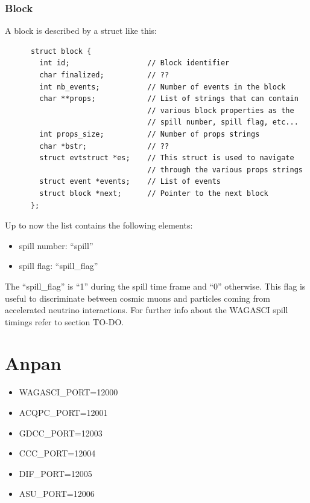 \subsubsection{Block}
A block is described by a struct like this:
\begin{lstlisting}
      struct block {
        int id;                  // Block identifier
        char finalized;          // ??
        int nb_events;           // Number of events in the block
        char **props;            // List of strings that can contain
                                 // various block properties as the
                                 // spill number, spill flag, etc...
        int props_size;          // Number of props strings
        char *bstr;              // ??
        struct evtstruct *es;    // This struct is used to navigate
                                 // through the various props strings
        struct event *events;    // List of events
        struct block *next;      // Pointer to the next block
      };
\end{lstlisting}
Up to now the  list contains the following elements:
\begin{itemize}
\item spill number: ``spill''
\item spill flag: ``spill\_flag''
\end{itemize}

The ``spill\_flag'' is ``1'' during the spill time frame and ``0''
otherwise. This flag is useful to discriminate between cosmic muons
and particles coming from accelerated neutrino interactions.  For
further info about the WAGASCI spill timings refer to section TO-DO.\@

\section{Anpan}
\begin{itemize}
\item WAGASCI\_PORT=12000
\item ACQPC\_PORT=12001
\item GDCC\_PORT=12003
\item CCC\_PORT=12004
\item DIF\_PORT=12005
\item ASU\_PORT=12006
\end{itemize}



